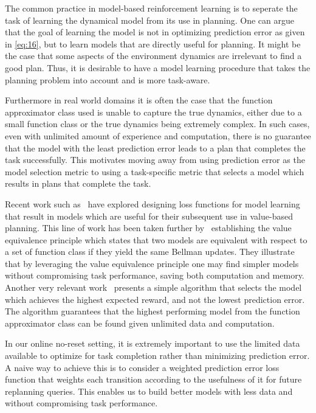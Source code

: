 The common practice in model-based reinforcement learning is to
seperate the task of learning the dynamical model from its use in
planning. One can argue that the goal of learning the model is not in
optimizing prediction error as given in \eqref{eq:16}, but to learn
models that are directly useful for planning. It might be the case
that some aspects of the environment dynamics are irrelevant to find a
good plan. Thus, it is desirable to have a model learning procedure
that takes the planning problem into account and is more
task-aware.

Furthermore in real world domains it is often the case
that the function approximator class used is unable to capture the
true dynamics, either due to a small function class or the true
dynamics being extremely complex. In such cases, even with unlimited
amount of experience and computation, there is no guarantee that the
model with the least prediction error leads to a plan that completes
the task successfully. This motivates moving away from using
prediction error as the model selection metric to using a
task-specific metric that selects a model which results in plans that
complete the task.

Recent work such as~\cite{DBLP:conf/aistats/FarahmandBN17,
  Farahmand2018} have explored designing loss functions for model
learning that result in models which are useful for their subsequent
use in value-based planning. This line of work has been taken further
by~\cite{grimm2020value} establishing the value equivalence principle
which states that two models are equivalent with respect to a set of
function class if they yield the same Bellman updates. They illustrate
that by leveraging the value equivalence principle one may find
simpler models without compromising task performance, saving both
computation and memory. Another very relevant
work~\cite{DBLP:conf/icra/JosephGRHR13} presents a simple algorithm
that selects the model which achieves the highest expected reward, and
not the lowest prediction error. The algorithm guarantees that the
highest performing model from the function approximator class can be
found given unlimited data and computation.

In our online no-reset setting, it is extremely important to use the
limited data available to optimize for task completion rather than
minimizing prediction error. A naive way to achieve this is to
consider a weighted prediction error loss function that weights each
transition according to the usefulness of it for future replanning
queries. This enables us to build better models with less data and
without compromising task performance.


